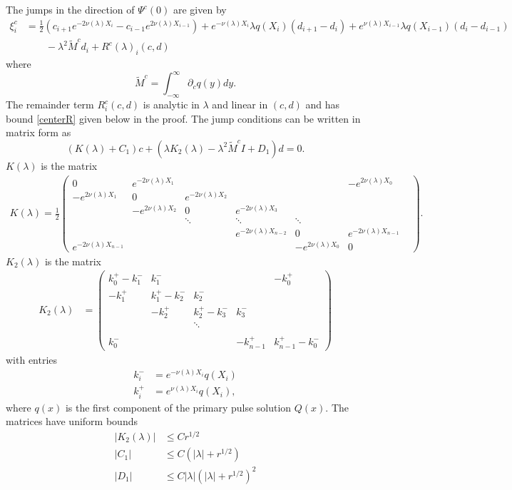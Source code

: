 \documentclass[thesis.tex]{subfiles}
\begin{document}
\begin{lemma}\label{jumpcenteradj}
The jumps in the direction of $\Psi^c(0)$ are given by
\begin{equation}\label{xic}
\begin{aligned}
\xi^c_i &= \frac{1}{2} \left( c_{i+1} e^{-2 \nu(\lambda)X_i} - c_{i-1} e^{2 \nu(\lambda)X_{i-1}} \right) + e^{-\nu(\lambda)X_i} \lambda q(X_i) (d_{i+1} - d_i )  + e^{\nu(\lambda)X_{i-1}} \lambda q(X_{i-1}) (d_i - d_{i-1} ) \\
&\qquad - \lambda^2 \tilde{M}^c d_i + R^c(\lambda)_i(c, d)
\end{aligned}
\end{equation}
where
\[
\tilde{M}^c = \int_{-\infty}^\infty \partial_c q(y) dy.
\]
The remainder term $R^c_i(c, d)$ is analytic in $\lambda$ and linear in $(c, d)$ and has bound \cref{centerR} given below in the proof. The jump conditions can be written in matrix form as
\begin{equation}\label{matrixjumpc}
\left( K(\lambda) + C_1 \right) c + (\lambda K_2(\lambda) - \lambda^2 \tilde{M}^c I + D_1) d = 0.
\end{equation}
$K(\lambda)$ is the matrix
\begin{align*}
K(\lambda) = \frac{1}{2}
\begin{pmatrix}
0 & e^{-2\nu(\lambda)X_1} & & & & -e^{2 \nu(\lambda)X_0} \\
-e^{2\nu(\lambda)X_1} & 0 & e^{-2\nu(\lambda)X_2} \\
& -e^{2 \nu(\lambda)X_2} & 0 & e^{-2\nu(\lambda)X_3} \\
& & \ddots & \ddots & \ddots &&  \\
&&& e^{-2\nu(\lambda)X_{n-2}} & 0 & e^{-2\nu(\lambda)X_{n-1}} \\
e^{-2\nu(\lambda)X_{n-1}} & & & & -e^{2 \nu(\lambda)X_0} & 0
\end{pmatrix}.
\end{align*}
$K_2(\lambda)$ is the matrix
\begin{align*}
K_2(\lambda) &= \begin{pmatrix}
k_0^+ - k_1^- & k_1^- &&& -k_0^+ \\
-k_1^+ & k_1^+ - k_2^- & k_2^- \\
& -k_2^+ & k_2^+ - k_3^- & k_3^- \\ && \ddots \\
\\
k_0^- &&& -k_{n-1}^+ & k_{n-1}^+ - k_0^- 
\end{pmatrix}
\end{align*}
with entries
\begin{align*}
k_i^- &= e^{-\nu(\lambda)X_i} q(X_i)\\
k_i^+ &= e^{\nu(\lambda)X_i} q(X_i),
\end{align*}
where $q(x)$ is the first component of the primary pulse solution $Q(x)$. The matrices have uniform bounds
\begin{align}\label{centerjumprem}
|K_2(\lambda)| &\leq C r^{1/2} \\
|C_1| &\leq C (|\lambda| + r^{1/2}) \\
|D_1| &\leq C |\lambda|(|\lambda| + r^{1/2})^2
\end{align}


\end{lemma}
\end{document}
